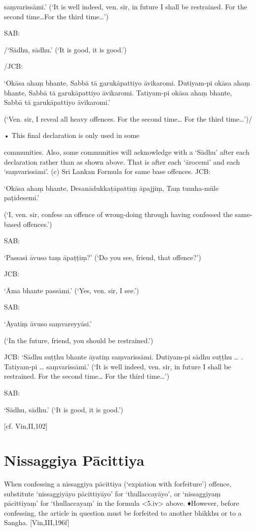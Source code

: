 saṃvarissāmi.’
(‘It is well indeed, ven. sir, in future I shall be
restrained. For the second time…For the third time…’)

SAB:

/‘Sādhu, sādhu.’
(‘It is good, it is good.’)

/JCB:

‘Okāsa ahaṃ bhante,
Sabbā tā garukāpattiyo āvikaromi.
Dutiyam-pi okāsa ahaṃ bhante,
Sabbā tā garukāpattiyo āvikaromi.
Tatiyam-pi okāsa ahaṃ bhante,
Sabbā tā garukāpattiyo āvikaromi.’

(‘Ven. sir, I reveal all heavy offences. For the second
time… For the third time…’)/

• This final declaration is only used in some

communities. Also, some communities will
acknowledge with a ‘Sādhu’ after each declaration rather than as shown above. That is
after each ‘ārocemi’ and each ‘saṃvarissāmi’.
(c) Sri Lankan Formula for same base offences.
JCB:

‘Okāsa ahaṃ bhante,
Desanādukkaṭāpattiṃ āpajjiṃ,
Taṃ tumha-mūle paṭidesemi.’

(‘I, ven. sir, confess an offence of wrong-doing
through having confessed the same-based offences.’)

SAB:

‘Passasi āvuso taṃ āpaṭṭiṃ?’
(‘Do you see, friend, that offence?’)

JCB:

‘Āma bhante passāmi.’
(‘Yes, ven. sir, I see.’)

SAB:

‘Āyatiṃ āvuso saṃvareyyāsi.’

(‘In the future, friend, you should be restrained.’)

JCB: ‘Sādhu suṭṭhu bhante āyatiṃ saṃvarissāmi.
Dutiyam-pi sādhu suṭṭhu … .
Tatiyam-pi … saṃvarissāmi.’
(‘It is well indeed, ven. sir, in future I shall be
restrained. For the second time… For the third time…’)

SAB:

‘Sādhu, sādhu.’
(‘It is good, it is good.’)

[cf. Vin,II,102]

\section{Nissaggiya Pācittiya}

When confessing a nissaggiya pācittiya (‘expiation with forfeiture’) offence, substitute ‘nissaggiyāyo pācittiyāyo’ for ‘thullaccayāyo’, or
‘nissaggiyaṃ pācittiyaṃ’ for ‘thullaccayaṃ’ in
the formula <5.iv> above.
♦However, before confessing, the article in
question must be forfeited to another bhikkhu
or to a Sangha.
[Vin,III,196f]

